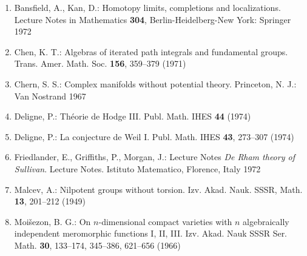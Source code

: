 \documentclass[
  english,
  a3paper,
  a3paper]{extarticle}
\begin{document}
\begin{enumerate}
\def\labelenumi{\arabic{enumi}.}
\item
  Bansfield, A., Kan, D.: Homotopy limits, completions and
  localizations. Lecture Notes in Mathematics \textbf{304},
  Berlin-Heidelberg-New York: Springer 1972
\item
  Chen, K. T.: Algebras of iterated path integrals and fundamental
  groups. Trans. Amer. Math. Soc. \textbf{156}, 359--379 (1971)
\item
  Chern, S. S.: Complex manifolds without potential theory. Princeton,
  N. J.: Van Nostrand 1967
\item
  Deligne, P.: Théorie de Hodge III. Publ. Math. IHES \textbf{44} (1974)
\item
  Deligne, P.: La conjecture de Weil I. Publ. Math. IHES \textbf{43},
  273--307 (1974)
\item
  Friedlander, E., Griffiths, P., Morgan, J.: Lecture Notes \emph{De
  Rham theory of Sullivan}. Lecture Notes. Istituto Matematico,
  Florence, Italy 1972
\item
  Malcev, A.: Nilpotent groups without torsion. Izv. Akad. Nauk. SSSR,
  Math. \textbf{13}, 201--212 (1949)
\item
  Moišezon, B. G.: On \(n\)-dimensional compact varieties with \(n\)
  algebraically independent meromorphic functions I, II, III. Izv. Akad.
  Nauk SSSR Ser. Math. \textbf{30}, 133--174, 345--386, 621--656 (1966)


\end{enumerate}
\end{document}
